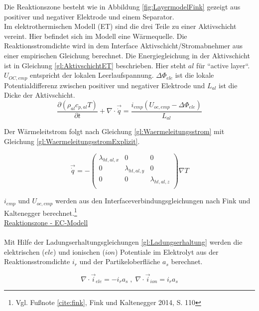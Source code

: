 Die Reaktionszone besteht wie in Abbildung \ref{fig:LayermodelFink} gezeigt aus positiver und negativer Elektrode und einem Separator. \\
Im elektrothermischen Modell (ET) sind die drei Teile zu einer Aktivschicht vereint. Hier befindet sich im Modell eine Wärmequelle. Die Reaktionsstromdichte wird in dem Interface Aktivschicht/Stromabnehmer aus einer empirischen Gleichung berechnet. Die Energiegleichung in der Aktivschicht ist in Gleichung \ref{gl:AktivschichtET} beschrieben. Hier steht $al$ für ``active layer``. $U_{OC,emp}$ entspricht der lokalen Leerlaufspannung. $\Delta \Phi_{ele}$ ist die lokale Potentialdifferenz zwischen positiver und negativer Elektrode und $L_{al}$ ist die Dicke der Aktivschicht.\\

\begin{equation}
	\frac{\partial (\rho_{al} c_{p,al} T)}{\partial t} + \nabla \cdot \vec{\dot{q}} = \frac{i_{emp} ( U_{oc,emp} - \Delta \Phi_{ele} )}{L_{al}} \label{gl:AktivschichtET}
\end{equation} 

Der Wärmeleitstrom folgt nach Gleichung \ref{gl:Waermeleitungsstrom} mit Gleichung \ref{gl:WaermeleitungsstromExplizit}.

\begin{equation}
	\vec{\dot{q}} = - \left( \begin{array}{ccc} \lambda_{ht,al,x} & 0 & 0\\ 0 & \lambda_{ht,al,y} & 0 \\ 0 & 0 & \lambda_{ht,al,z}\\ \end{array} \right) \nabla T \label{gl:WaermeleitungsstromExplizit}
\end{equation}
 
$i_{emp}$ und $U_{oc,emp}$ werden aus den Interfaceverbindungsgleichungen nach Fink und Kaltenegger berechnet.\footnote{Vgl. Fußnote \ref{cite:fink}, Fink und Kaltenegger 2014,  S. 110}\\

 
\underline{Reaktionszone - EC-Modell}\\
\\

Mit Hilfe der Ladungserhaltungsgleichungen \ref{gl:Ladungserhaltung} werden die elektrischen ($ele$) und ionischen ($ion$) Potentiale im Elektrolyt aus der Reaktionsstromdichte $i_{r}$ und der Partikeloberfläche $a_{s}$ berechnet.

\begin{equation}
	\nabla \cdot \vec{i}_{ele} = - i_{r} a_{s} \; , \; \nabla \cdot \vec{i}_{ion} = i_{r} a_{s} \label{gl:Ladungserhaltung}
\end{equation}


